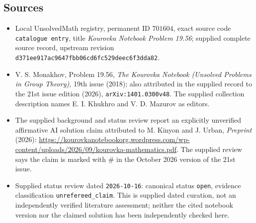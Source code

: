 \documentclass[11pt]{article}
\begin{document}
\subsection{Sources}
\begin{itemize}
\item Local UnsolvedMath registry, permanent ID \(701604\), exact source code \texttt{catalogue entry}, title \emph{Kourovka Notebook Problem 19.56}; supplied complete source record, upstream revision \texttt{d371ee917ac9647fbb06cd6fc529deec6f3dda82}.
\item V. S. Monakhov, Problem 19.56, \emph{The Kourovka Notebook (Unsolved Problems in Group Theory)}, 19th issue (2018); also attributed in the supplied record to the 21st issue edition (2026), \texttt{arXiv:1401.0300v48}. The supplied collection description names E. I. Khukhro and V. D. Mazurov as editors.
\item The supplied background and status review report an explicitly unverified affirmative AI solution claim attributed to M. Kinyon and J. Urban, \emph{Preprint} (2026): \url{https://kourovkanotebookorg.wordpress.com/wp-content/uploads/2026/09/kourovka-mathematics.pdf}. The supplied review says the claim is marked with \(\#\) in the October 2026 version of the 21st issue.
\item Supplied status review dated \texttt{2026-10-16}: canonical status \texttt{open}, evidence classification \texttt{unrefereed\_claim}. This is supplied dated curation, not an independently verified literature assessment; neither the cited notebook version nor the claimed solution has been independently checked here.
\end{itemize}
\end{document}

